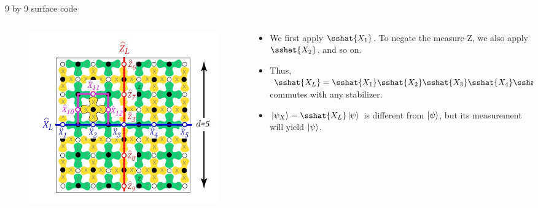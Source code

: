 \documentclass{beamer}
\begin{document}
    \begin{frame}{9 by 9 surface code}
        \begin{minipage}[0.65\textheight]{\textwidth}
        \begin{columns}[T]
            \begin{column}{0.4\textwidth}
                \begin{figure}[t]
                    \centering
                    \includegraphics[height=0.6\textheight]{./Images/surf-code-logical.jpg}
                \end{figure}
            \end{column}
            \begin{column}{0.6\textwidth}
                \begin{itemize}
                \item We first apply $ \sshat{X_1} $. To negate the measure-Z, we also apply $ \sshat{X_2} $, and so on.
                \item Thus, $ \sshat{X_L} = \sshat{X_1}\sshat{X_2}\sshat{X_3}\sshat{X_4}\sshat{X_5} $ commutes with any stabilizer.
                \item $ \ket{\psi_X} = \sshat{X_L} \ket{\psi} $ is different from $ \ket{\psi} $, but its measurement will yield $ \ket{\psi} $.
                \end{itemize}
            \end{column}
        \end{columns}
        \end{minipage}
    \end{frame}
    
\end{document}
